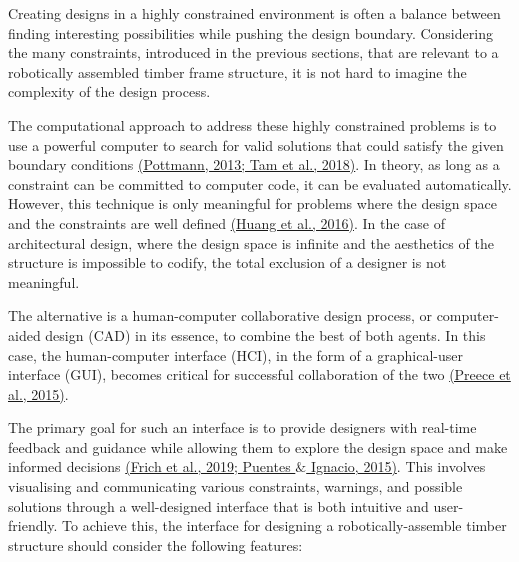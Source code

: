Creating designs in a highly constrained environment is often a balance between finding interesting possibilities while pushing the design boundary. Considering the many constraints, introduced in the previous sections, that are relevant to a robotically assembled timber frame structure, it is not hard to imagine the complexity of the design process. 

The computational approach to address these highly constrained problems is to use a powerful computer to search for valid solutions that could satisfy the given boundary conditions \href{https://www.zotero.org/google-docs/?IhApCE}{(Pottmann, 2013; Tam et al., 2018)}. In theory, as long as a constraint can be committed to computer code, it can be evaluated automatically. However, this technique is only meaningful for problems where the design space and the constraints are well defined \href{https://www.zotero.org/google-docs/?5kfhGC}{(Huang et al., 2016)}. In the case of architectural design, where the design space is infinite and the aesthetics of the structure is impossible to codify, the total exclusion of a designer is not meaningful. 

The alternative is a human-computer collaborative design process, or computer-aided design (CAD) in its essence, to combine the best of both agents. In this case, the human-computer interface (HCI), in the form of a graphical-user interface (GUI), becomes critical for successful collaboration of the two \href{https://www.zotero.org/google-docs/?3vtUPQ}{(Preece et al., 2015)}. 

The primary goal for such an interface is to provide designers with real-time feedback and guidance while allowing them to explore the design space and make informed decisions \href{https://www.zotero.org/google-docs/?5BPzBQ}{(Frich et al., 2019; Puentes $\&$ Ignacio, 2015)}. This involves visualising and communicating various constraints, warnings, and possible solutions through a well-designed interface that is both intuitive and user-friendly. To achieve this, the interface for designing a robotically-assemble timber structure should consider the following features: 

